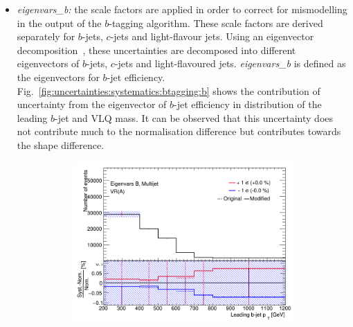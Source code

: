 \begin{itemize}
	\item \textit{eigenvars\_b:} the scale factors are applied in order to correct for mismodelling in the output of the $b$-tagging algorithm. These scale factors are derived separately for $b$-jets, $c$-jets and light-flavour jets. Using an eigenvector decomposition~\cite{btagging:uncertainties}, these uncertainties are decomposed into different eigenvectors of $b$-jets, $c$-jets and light-flavoured jets. \textit{eigenvars\_b} is defined as the eigenvectors for $b$-jet efficiency. Fig.\ \ref{fig:uncertainties:systematics:btagging:b} shows the contribution of uncertainty from the eigenvector of $b$-jet efficiency in \pt distribution of the leading $b$-jet and VLQ mass. It can be observed that this uncertainty does not contribute much to the normalisation difference but contributes towards the shape difference.
	\begin{figure}[hbt!]
		\centering
		\graphicspath{{figs/chapter6/Systematics/EigenvarsB/}}
		\begin{subfigure}{.35\textwidth}
			\centering
			\includegraphics[width=\linewidth,height=\textheight,keepaspectratio]{VR_B_jet_pt_Multijets.png}
			\caption{}
			\label{fig:uncertainties:systematics:btagging:b:jetpt}
		\end{subfigure}\hspace{0.6cm}
		\begin{subfigure}{.35\textwidth}
			\centering

\end{subfigure}
\end{figure}
\end{itemize}
